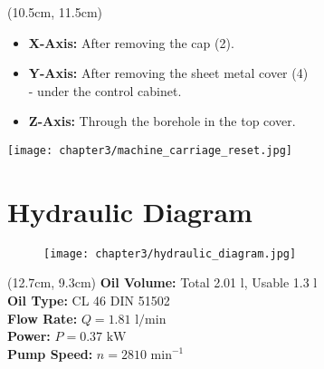 \begin{textblock*}{\textwidth}(10.5cm, 11.5cm)
\begin{itemize}
    \item \textbf{X-Axis:} After removing the cap (2).  
    \item \textbf{Y-Axis:} After removing the sheet metal cover (4) \\- under the control cabinet.  
    \item \textbf{Z-Axis:} Through the borehole in the top cover.  
\end{itemize}

\vspace{0.3cm}


\end{textblock*}

\begin{minipage}{\textwidth}
    \centering
    \texttt{[image: chapter3/machine\_carriage\_reset.jpg]}
\end{minipage}

\section{Hydraulic Diagram}
\setcounter{section}{18}

\begin{figure}[h]
    \centering
    \texttt{[image: chapter3/hydraulic\_diagram.jpg]}
\end{figure}

\begin{textblock*}{\textwidth}(12.7cm, 9.3cm)
    \textbf{Oil Volume:} Total 2.01 l, Usable 1.3 l \\
    \textbf{Oil Type:} CL 46 DIN 51502 \\
    \textbf{Flow Rate:} $Q = 1.81 \text{ l/min}$ \\
    \textbf{Power:} $P = 0.37 \text{ kW}$ \\
    \textbf{Pump Speed:} $n = 2810 \text{ min}^{-1}$
\end{textblock*}

